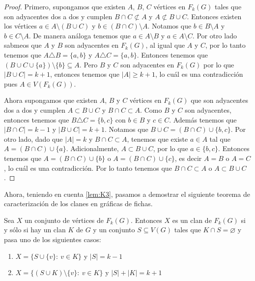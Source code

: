     
    \begin{proof}
        Primero, supongamos que existen $A$, $B$, $C$ v\'ertices en $F_k(G)$
        tales que son adyacentes dos a dos y cumplen $B \cap C \not\subset A$ y
        $A \not\subset B \cup C$. Entonces existen los v\'ertices  $a \in A
        \setminus (B \cup C)$ y $b \in (B \cap C)\setminus A$. Notamos que $b
        \in B \setminus A$ y $b \in C \setminus A$. De manera an\'aloga tenemos
        que $a \in A \setminus B$ y $a \in A \setminus C$. Por otro lado sabmeos
        que $A$ y $B$ son adyacentes en $F_k(G)$, al igual que $A$ y $C$, por lo
        tanto tenemos que $A \triangle B = \{a,b\}$ y $A \triangle C = \{a,
        b\}$. Entonces tenemos que $(B \cup C \cup \{a\})\setminus \{b\}
        \subseteq A$. Pero $B$ y $C$ son adyacentes en $F_k(G)$ por lo que $|B
        \cup C| = k+1$, entonces tenemos que $|A| \geq k+1$, lo cu\'al es una
        contradicci\'on pues $A \in V (F_k(G))$. 

        Ahora supongamos que existen $A$, $B$ y $C$ v\'ertices en $F_k(G)$ que
        son adyacentes dos a dos y cumplen $A \subset B \cup C$ y $B \cap C
        \subset A$. Como $B$ y $C$ son adyacentes, entonces tenemos que $B
        \triangle C = \{b,c\}$ con $b \in B$ y $c \in C$. Adem\'as tenemos que
        $|B \cap C| = k-1$ y $|B \cup C| = k +1$. Notamos que $B \cup C = (B\cap
        C) \cup \{b,c\}$. Por otro lado, dado que $|A|=k$ y $B \cap C \subset
        A$, tenemos que existe $a \in A$ tal que $A = (B \cap C) \cup \{a\}$.
        Adicionalmente, $A \subset B \cup C$, por lo que $a \in \{b, c\}$.
        Entonces tenemos que $A = (B \cap C) \cup \{b\}$ o $A = (B \cap C) \cup
        \{c\}$, es decir $A = B$ o $A=C$, lo cu\'al es una contradicci\'on. Por
        lo tanto tenemos que $B \cap C \subset A$ o $A \subset B \cup C$.
    \end{proof}

    Ahora, teniendo en cuenta \cref{lem:K3}, pasamos a demostrar el siguiente
    teorema de caracterizaci\'on de los clanes en gr\'aficas de fichas.

    \begin{teorema}
    \label{teo:clanG-clanFG}
        Sea $X$ un conjunto de v\'ertices de $F_k(G)$. Entonces $X$ es un clan
        de $F_k(G)$ si y s\'olo si hay un clan $K$ de $G$ y un conjunto $S
        \subseteq V(G)$ tales que $K \cap S = \varnothing$ y pasa uno de los
        siguientes casos:
        \begin{enumerate}
            \item $X = \{S \cup \{v\}\colon\ v \in K\}$ y $|S| = k-1$
            \item $X = \{(S\cup K) \setminus \{v\}\colon\ v \in K \}$ y $|S| +
            |K| = k+1$
        \end{enumerate}
    \end{teorema}

